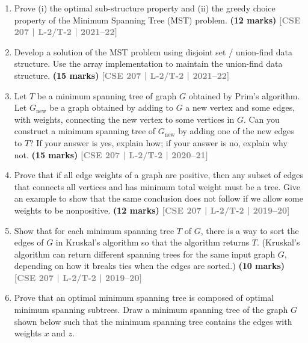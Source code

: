 \documentclass[12pt,a3paper]{article}
\newcommand{\yr}[1]{\hfill\textcolor{gray}{\small\textbf{[#1]}}}
\newcommand{\mk}[1]{\textcolor{orange!70!black}{\small\textbf{(#1 marks)}}}
\begin{document}
\begin{enumerate}
\begin{center}
\end{center}
\mk{12} \yr{CSE 207 | L-2/T-1 | 2023--24}

\item Prove (i) the optimal sub-structure property and (ii) the greedy choice property of the Minimum Spanning Tree (MST) problem.
\mk{12} \yr{CSE 207 | L-2/T-2 | 2021--22}

\item Develop a solution of the MST problem using disjoint set / union-find data structure. Use the array implementation to maintain the union-find data structure.
\mk{15} \yr{CSE 207 | L-2/T-2 | 2021--22}

\item Let $T$ be a minimum spanning tree of graph $G$ obtained by Prim's algorithm. Let $G_{\text{new}}$ be a graph obtained by adding to $G$ a new vertex and some edges, with weights, connecting the new vertex to some vertices in $G$. Can you construct a minimum spanning tree of $G_{\text{new}}$ by adding one of the new edges to $T$? If your answer is yes, explain how; if your answer is no, explain why not.
\mk{15} \yr{CSE 207 | L-2/T-2 | 2020--21}

\item Prove that if all edge weights of a graph are positive, then any subset of edges that connects all vertices and has minimum total weight must be a tree. Give an example to show that the same conclusion does not follow if we allow some weights to be nonpositive.
\mk{12} \yr{CSE 207 | L-2/T-2 | 2019--20}

\item Show that for each minimum spanning tree $T$ of $G$, there is a way to sort the edges of $G$ in Kruskal's algorithm so that the algorithm returns $T$. (Kruskal's algorithm can return different spanning trees for the same input graph $G$, depending on how it breaks ties when the edges are sorted.)
\mk{10} \yr{CSE 207 | L-2/T-2 | 2019--20}

\item Prove that an optimal minimum spanning tree is composed of optimal minimum spanning subtrees.
 Draw a minimum spanning tree of the graph $G$ shown below such that the minimum spanning tree contains the edges with weights $x$ and $z$.
\begin{center}
  

\end{center}
\end{enumerate}
\end{document}
